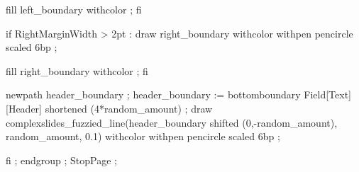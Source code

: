        fill left_boundary withcolor  ;
     fi

     if RightMarginWidth > 2pt :
        draw right_boundary
           withcolor 
           withpen pencircle scaled 6bp ;

       fill right_boundary withcolor  ;
     fi

     newpath header_boundary ;
     header_boundary := bottomboundary Field[Text][Header] shortened (4*random_amount) ;
     draw complexslides_fuzzied_line(header_boundary shifted (0,-random_amount),
                                     random_amount, 0.1)
           withcolor 
           withpen pencircle scaled 6bp ;

  fi ;
  endgroup ;
  StopPage ;
\stopuseMPgraphic


\setupbackgrounds[\v!page][\c!background={complexslides:pagebackground}]


\protect

\stopmodule

